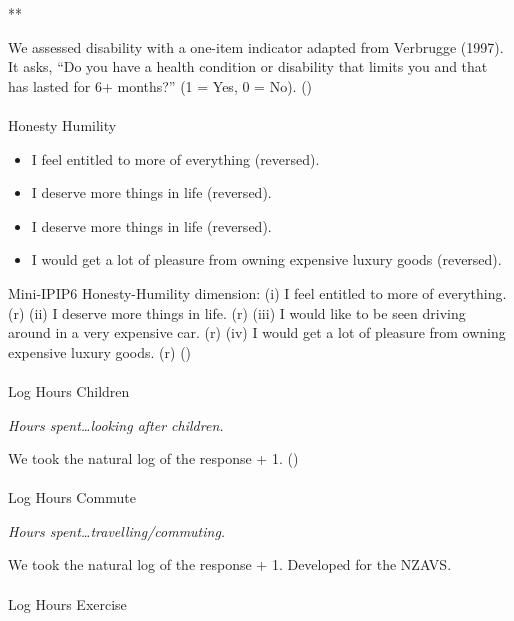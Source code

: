 \documentclass[
  single column]{article}
\makeatletter
\let\oldparagraph\paragraph
\renewcommand{\paragraph}{
    \@ifstar
      \xxxParagraphStar
      \xxxParagraphNoStar
  }
\newcommand{\xxxParagraphStar}[1]{\oldparagraph*{#1}\mbox{}}
\newcommand{\xxxParagraphNoStar}[1]{\oldparagraph{#1}\mbox{}}
\providecommand{\tightlist}{%
  \setlength{\itemsep}{0pt}\setlength{\parskip}{0pt}}\usepackage{longtable,booktabs,array}
\makeatother
\begin{document}
**

We assessed disability with a one-item indicator adapted from Verbrugge
(1997). It asks, ``Do you have a health condition or disability that
limits you and that has lasted for 6+ months?'' (1 = Yes, 0 = No).
()

\paragraph{Honesty Humility}\label{honesty-humility}

\begin{itemize}
\tightlist
\item
  I feel entitled to more of everything (reversed).
\item
  I deserve more things in life (reversed).
\item
  I deserve more things in life (reversed).
\item
  I would get a lot of pleasure from owning expensive luxury goods
  (reversed).
\end{itemize}

Mini-IPIP6 Honesty-Humility dimension: (i) I feel entitled to more of
everything. (r) (ii) I deserve more things in life. (r) (iii) I would
like to be seen driving around in a very expensive car. (r) (iv) I would
get a lot of pleasure from owning expensive luxury goods. (r)
()

\paragraph{Log Hours Children}\label{log-hours-children}

\emph{Hours spent\ldots looking after children.}

We took the natural log of the response + 1.
()

\paragraph{Log Hours Commute}\label{log-hours-commute}

\emph{Hours spent\ldots travelling/commuting.}

We took the natural log of the response + 1. Developed for the NZAVS.

\paragraph{Log Hours Exercise}\label{log-hours-exercise}
\end{document}
